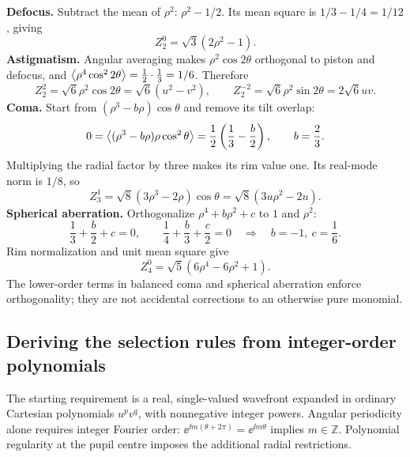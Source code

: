 \textbf{Defocus.} Subtract the mean of $\rho^2$: $\rho^2-1/2$. Its mean square is $1/3-1/4=1/12$, giving
\begin{equation}
Z_2^0=\sqrt3(2\rho^2-1).
\end{equation}
\textbf{Astigmatism.} Angular averaging makes $\rho^2\cos2\theta$ orthogonal to piston and defocus, and
$\left\langle \rho^4\cos^22\theta\right\rangle=\tfrac12\cdot\tfrac13=1/6$. Therefore
\begin{equation}
Z_2^2=\sqrt6\rho^2\cos2\theta=\sqrt6(u^2-v^2),\qquad
Z_2^{-2}=\sqrt6\rho^2\sin2\theta=2\sqrt6uv.
\end{equation}
\textbf{Coma.} Start from $(\rho^3-b\rho)\cos\theta$ and remove its tilt overlap:
\begin{equation}
0=\left\langle (\rho^3-b\rho)\rho\cos^2\theta\right\rangle
=\frac12\left(\frac13-\frac b2\right),\qquad b=\frac23.
\end{equation}
Multiplying the radial factor by three makes its rim value one. Its real-mode norm is $1/8$, so
\begin{equation}
Z_3^1=\sqrt8(3\rho^3-2\rho)\cos\theta
=\sqrt8(3u\rho^2-2u).
\end{equation}
\textbf{Spherical aberration.} Orthogonalize $\rho^4+b\rho^2+c$ to $1$ and $\rho^2$:
\begin{equation}
\frac13+\frac b2+c=0,\qquad
\frac14+\frac b3+\frac c2=0
\quad\Longrightarrow\quad b=-1,\ c=\frac16.
\end{equation}
Rim normalization and unit mean square give
\begin{equation}
Z_4^0=\sqrt5(6\rho^4-6\rho^2+1).
\end{equation}
The lower-order terms in balanced coma and spherical aberration enforce orthogonality; they are not accidental corrections to an otherwise pure monomial.

\subsection{Deriving the selection rules from integer-order polynomials}
The starting requirement is a real, single-valued wavefront expanded in ordinary Cartesian polynomials $u^pv^q$, with nonnegative integer powers. Angular periodicity alone requires integer Fourier order: $\ee^{\ii m(\theta+2\pi)}=\ee^{\ii m\theta}$ implies $m\in\mathbb Z$. Polynomial regularity at the pupil centre imposes the additional radial restrictions.

